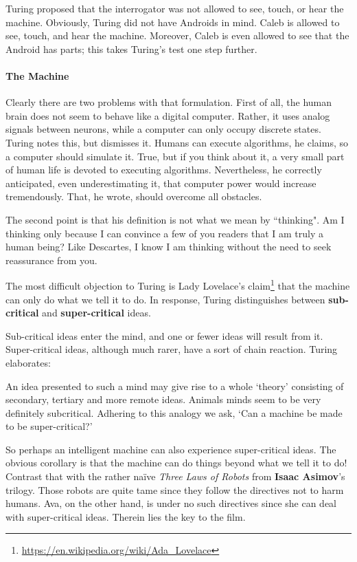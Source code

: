 Turing proposed that the interrogator was not allowed to see, touch, or hear the machine. Obviously, Turing did not have
Androids in mind. Caleb is allowed to see, touch, and hear the machine. Moreover, Caleb is even allowed to see that the
Android has parts; this takes Turing's test one step further.

\paragraph{The Machine}
Clearly there are two problems with that formulation. First of all, the human brain does not seem to behave like a
digital computer. Rather, it uses analog signals between neurons, while a computer can only occupy discrete states.
Turing notes this, but dismisses it. Humans can execute algorithms, he claims, so a computer should simulate it. True,
but if you think about it, a very small part of human life is devoted to executing algorithms. Nevertheless, he
correctly anticipated, even underestimating it, that computer power would increase tremendously. That, he wrote, should
overcome all obstacles.

The second point is that his definition is not what we mean by ``thinking". Am I thinking only because I can convince a
few of you readers that I am truly a human being? Like Descartes, I know I am thinking without the need to seek
reassurance from you.

The most difficult objection to Turing is Lady Lovelace's claim\footnote{\url{https://en.wikipedia.org/wiki/Ada_Lovelace}} that the machine can only do what
we tell it to do. In response, Turing distinguishes between \textbf{sub-critical} and \textbf{super-critical} ideas.

Sub-critical ideas enter the mind, and one or fewer ideas will result from it. Super-critical ideas, although much
rarer, have a sort of chain reaction. Turing elaborates:

\begin{quotex}
An idea presented to such a mind may give rise to a whole `theory' consisting
of secondary, tertiary and more remote ideas. Animals minds seem to be very definitely subcritical. Adhering to this
analogy we ask, `Can a machine be made to be
super-critical?' 

\end{quotex}
So perhaps an intelligent machine can also experience super-critical ideas. The obvious corollary is that the machine
can do things beyond what we tell it to do! Contrast that with the rather naïve \emph{Three Laws of Robots} from
\textbf{Isaac Asimov}'s trilogy. Those robots are quite tame since they follow the directives not
to harm humans. Ava, on the other hand, is under no such directives since she can deal with super-critical ideas.
Therein lies the key to the film.


